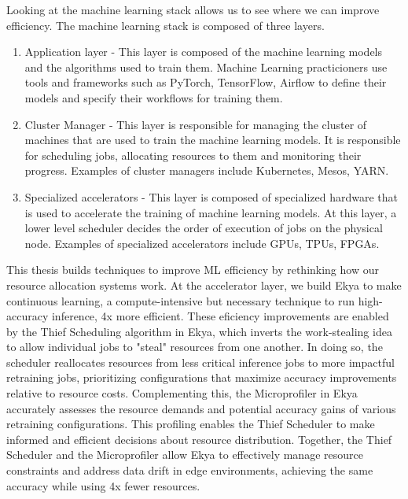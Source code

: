 Looking at the machine learning stack allows us to see where we can improve efficiency. The machine learning stack is composed of three layers.

\begin{enumerate}
    \item Application layer - This layer is composed of the machine learning models and the algorithms used to train them. Machine Learning practicioners use tools and frameworks such as PyTorch, TensorFlow, Airflow to define their models and specify their workflows for training them.
    \item Cluster Manager - This layer is responsible for managing the cluster of machines that are used to train the machine learning models. It is responsible for scheduling jobs, allocating resources to them and monitoring their progress. Examples of cluster managers include Kubernetes, Mesos, YARN.
    \item Specialized accelerators - This layer is composed of specialized hardware that is used to accelerate the training of machine learning models. At this layer, a lower level scheduler decides the order of execution of jobs on the physical node. Examples of specialized accelerators include GPUs, TPUs, FPGAs.
\end{enumerate}

This thesis builds techniques to improve ML efficiency by rethinking how our resource allocation systems work. At the accelerator layer, we build Ekya to make continuous learning, a compute-intensive but necessary technique to run high-accuracy inference, 4x more efficient. These eficiency improvements are enabled by the Thief Scheduling algorithm in Ekya, which inverts the work-stealing idea \cite{something} to allow individual jobs to "steal" resources from one another. In doing so, the scheduler reallocates resources from less critical inference jobs to more impactful retraining jobs, prioritizing configurations that maximize accuracy improvements relative to resource costs. Complementing this, the Microprofiler in Ekya accurately assesses the resource demands and potential accuracy gains of various retraining configurations. This profiling enables the Thief Scheduler to make informed and efficient decisions about resource distribution. Together, the Thief Scheduler and the Microprofiler allow Ekya to effectively manage resource constraints and address data drift in edge environments, achieving the same accuracy while using 4x fewer resources.

